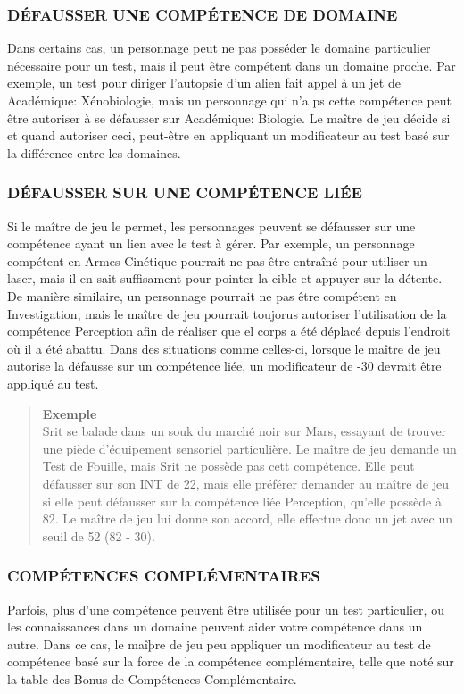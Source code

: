 \subsubsection{DÉFAUSSER UNE COMPÉTENCE DE DOMAINE} Dans certains cas, un personnage peut ne pas posséder le domaine particulier nécessaire pour un test, mais il peut être compétent dans un domaine proche. Par exemple, un test pour diriger l'autopsie d'un alien fait appel à un jet de Académique: Xénobiologie, mais un personnage qui n'a ps cette compétence peut être autoriser à se défausser sur Académique: Biologie. Le maître de jeu décide si et quand autoriser ceci, peut-être en appliquant un modificateur au test basé sur la différence entre les domaines. 



\subsubsection{DÉFAUSSER SUR UNE COMPÉTENCE LIÉE} Si le maître de jeu le permet, les personnages peuvent se défausser sur une compétence ayant un lien avec le test à gérer. Par exemple, un personnage compétent en Armes Cinétique pourrait ne pas être entraîné pour utiliser un laser, mais il en sait suffisament pour pointer la cible et appuyer sur la détente. De manière similaire, un personnage pourrait ne pas être compétent en Investigation, mais le maître de jeu pourrait toujorus autoriser l'utilisation de la compétence Perception afin de réaliser que el corps a été déplacé depuis l'endroit où il a été abattu. Dans des situations comme celles-ci, lorsque le maître de jeu autorise la défausse sur un compétence liée, un modificateur de -30 devrait être appliqué au test. 

\begin{quotation} \textbf{Exemple} \\ Srit se balade dans un souk du marché noir sur Mars, essayant de trouver une piède d'équipement sensoriel particulière. Le maître de jeu demande un Test de Fouille, mais Srit ne possède pas cett compétence. Elle peut défausser sur son INT de 22, mais elle préférer demander au maître de jeu si elle peut défausser sur la compétence liée Perception, qu'elle possède à 82. Le maître de jeu lui donne son accord, elle effectue donc un jet avec un seuil de 52 (82 - 30). \end{quotation} 







\subsubsection{COMPÉTENCES COMPLÉMENTAIRES} Parfois, plus d'une compétence peuvent être utilisée pour un test particulier, ou les connaissances dans un domaine peuvent aider votre compétence dans un autre. Dans ce cas, le maîþre de jeu peu appliquer un modificateur au test de compétence basé sur la force de la compétence complémentaire, telle que noté sur la table des Bonus de Compétences Complémentaire. 



